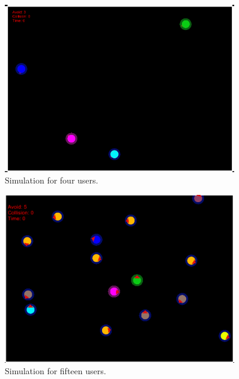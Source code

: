 \begin{figure}[H]\centering
	\includegraphics[width=0.9\textwidth]{Pictures/four users share real space.png}%
	\caption{Simulation for four users.}\label{fig:Simulation_4}%
	
\end{figure}


\begin{figure}[H]\centering
	\includegraphics[width=0.9\textwidth]{Pictures/fifteen users share real space.png}%
	\caption{Simulation for fifteen users.}\label{fig:Simulation_15}%
	
\end{figure}

\newpage

\begin{table}[h!]\centering
	\caption{Data Collection.}
	\label{tab:Data CollectionEx3}%
\end{table} 

